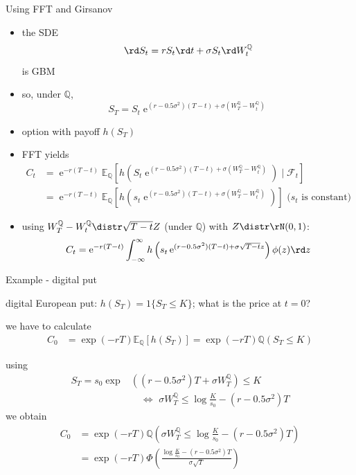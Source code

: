 \documentclass[pdf, handout]{beamer}
\newcommand{\e}{\operatorname{e}}
\begin{document}
\begin{frame}{Using FFT and Girsanov}
\small{
\begin{itemize}
\item the SDE
\[
\rd S_t= rS_t \rd t + \sigma S_t \rd W_t^{\mathbb{Q}}
\]
is GBM
\item so, under $\mathbb{Q}$,
\[
S_T=S_t\e^{
(r-0.5\sigma^2) (T-t) +\sigma (W_T^{\mathbb{Q}}
-W_t^{\mathbb{Q}})
}
\]
\item option with payoff $h(S_T)$
\item FFT yields
\begin{align*}
C_t&=\e^{-r(T-t)}\mathbb{E}_{\mathbb{Q}}\left[ h\left(
S_t\e^{
(r-0.5\sigma^2) (T-t) +\sigma (W_T^{\mathbb{Q}}
-W_t^{\mathbb{Q}}) }\right) 
\mid  \mathcal{F}_t
\right]  \\
&=
\e^{-r(T-t)}\mathbb{E}_{\mathbb{Q}}\left[ h\left(
s_t\e^{
(r-0.5\sigma^2) (T-t) +\sigma (W_T^{\mathbb{Q}}
-W_t^{\mathbb{Q}}) }\right) 
\right] \text{ ($s_t$ is constant)}
\end{align*}
\item using $W_T^{\mathbb{Q}}- W_t^{\mathbb{Q}}\distr \sqrt{T-t} Z$ (under $\mathbb{Q}$) with $Z\distr \rN(0,1)$:
\[
C_t=\e^{-r(T-t)}\int_{-\infty}^{\infty}
h\left( s_t\e^{
(r-0.5\sigma^2) (T-t) +\sigma \sqrt{T-t}z }\right) \phi(z) \rd z
\]
\end{itemize}
}
\end{frame}
%
\begin{frame}{Example - digital put}
\begin{itemize}
{\small
\item digital European put: $h(S_T)=1\{ S_T\leq K\}$; what is the price at $t=0$?
\item we have to calculate
\begin{align*}
C_0&=\exp(-rT)\mathbb{E}_{\mathbb{Q}}\left[ h\left(
S_T\right)\right]
= \exp(-rT) \mathbb{Q}\left( S_T\leq K\right)
\end{align*}
\item using
\begin{align*}
 S_T=s_0\exp&\left(
(r-0.5\sigma^2) T +\sigma W_T^{\mathbb{Q}} \right)\leq K \,\, \\ &\quad
\Leftrightarrow\,\,
\sigma W_T^{\mathbb{Q}}\leq \log \frac{K}{s_0} -(r-0.5\sigma^2) T
\end{align*}
we obtain
\begin{align*}
C_0&=\exp(-rT)\mathbb{Q}\left( \sigma W_T^{\mathbb{Q}}\leq \log \frac{K}{s_0} -(r-0.5\sigma^2) T \right)
\\
&
=\exp(-rT)\Phi\left(
\frac{
\log \frac{K}{s_0} -(r-0.5\sigma^2) T }{
\sigma\sqrt{T}}
\right)
\end{align*}}
\end{itemize}
\end{frame}
%
\end{document}
